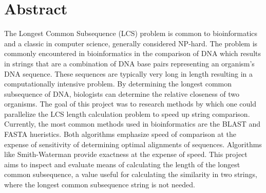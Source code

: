 \section{Abstract}

The Longest Common Subsequence (LCS) problem is common to
bioinformatics and a classic in computer science, generally considered
NP-hard.  The problem is commonly encountered in bioinformatics in the
comparison of DNA which results in strings that are a combination of
DNA base pairs representing an organism's DNA sequence. These
sequences are typically very long in length resulting in a
computationally intensive problem. By determining the longest common
subsequence of DNA, biologists can determine the relative closeness of
two organisms. The goal of this project was to research methods by
which one could parallelize the LCS length calculation problem to
speed up string comparison. Currently, the most common methods used in
bioinformatics are the BLAST and FASTA hueristics. Both algorithms
emphasize speed of comparison at the expense of sensitivity of
determining optimal alignments of sequences. Algorithms like
Smith-Waterman provide exactness at the expense of speed. This project
aims to inspect and evaluate means of calculating the length of the
longest common subsequence, a value useful for calculating the
similarity in two strings, where the longest common subsequence string
is not needed.

